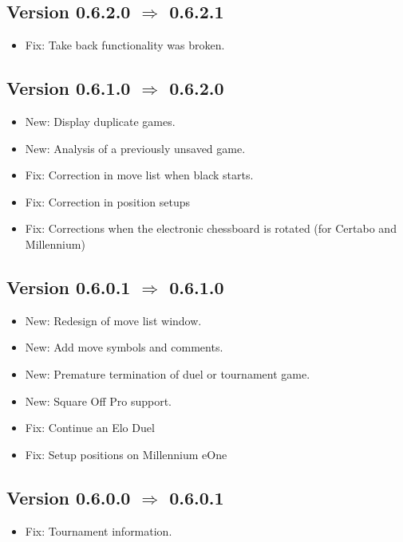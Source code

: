 \documentclass[11pt,a4paper]{article}
\begin{document}
\subsection*{Version 0.6.2.0 $\Rightarrow$  0.6.2.1}
\begin{itemize}
	\item {\color{red}Fix}: Take back functionality was broken.
\end{itemize}

\subsection*{Version 0.6.1.0 $\Rightarrow$  0.6.2.0}
\begin{itemize}
	\item {\color{blue}New}: Display duplicate games.
	\item {\color{blue}New}: Analysis of a previously unsaved game.
	\item {\color{red}Fix}: Correction in move list when black starts.
	\item {\color{red}Fix}: Correction in position setups
	\item {\color{red}Fix}: Corrections when the electronic chessboard is rotated (for Certabo and Millennium)
\end{itemize}

\subsection*{Version 0.6.0.1 $\Rightarrow$  0.6.1.0}
\begin{itemize}
    \item {\color{blue}New}: Redesign of move list window.
    \item {\color{blue}New}: Add move symbols and comments.
	\item {\color{blue}New}: Premature termination of duel or tournament game.
	\item {\color{blue}New}: Square Off Pro support.	
	\item {\color{red}Fix}: Continue an Elo Duel
	\item {\color{red}Fix}: Setup positions on Millennium eOne
\end{itemize}

\subsection*{Version 0.6.0.0 $\Rightarrow$  0.6.0.1}
\begin{itemize}
	\item {\color{red}Fix}: Tournament information.		
\end{itemize}
\end{document}
